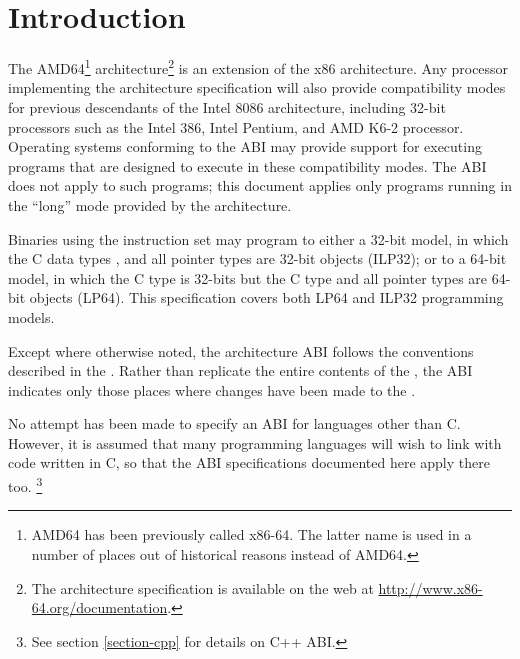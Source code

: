 \chapter{Introduction\label{intro}}

The AMD64\footnote{AMD64 has been previously called x86-64.  The
  latter name is used in a number of places out of historical reasons
  instead of AMD64.}  architecture\footnote{The architecture
  specification is available on the web at
  \url{http://www.x86-64.org/documentation}.} is an extension of the
x86 architecture.  Any processor implementing the \xARCH architecture
specification will also provide compatibility modes for previous
descendants of the Intel 8086 architecture, including 32-bit
processors such as the Intel 386, Intel Pentium, and AMD K6-2
processor.  Operating systems conforming to the \xARCH ABI may provide
support for executing programs that are designed to execute in these
compatibility modes.  The \xARCH ABI does not apply to such programs;
this document applies only programs running in the ``long'' mode
provided by the \xARCH architecture.

Binaries using the \xARCH instruction set may program to either a 32-bit
model, in which the C data types ,  and all
pointer types are 32-bit objects (ILP32); or to a 64-bit model,
in which the C  type is 32-bits but the C  type
and all pointer types are 64-bit objects (LP64). This specification
covers both LP64 and ILP32 programming models.

Except where otherwise noted, the \xARCH architecture ABI follows the
conventions described in the \intelabi.  Rather than replicate the
entire contents of the \intelabi, the \xARCH ABI indicates only those
places where changes have been made to the \intelabi.

No attempt has been made to specify an ABI for languages other than C.
However, it is assumed that many programming languages will wish to
link with code written in C, so
that the ABI specifications documented here apply there too.%
\footnote{See section \ref{section-cpp} for details on C++ ABI.}

